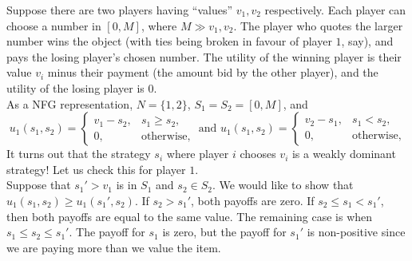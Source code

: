 	\begin{fex}
		Suppose there are two players having ``values'' $v_1,v_2$ respectively. Each player can choose a number in $[0,M]$, where $M \gg v_1,v_2$. The player who quotes the larger number wins the object (with ties being broken in favour of player $1$, say), and pays the losing player's chosen number. The utility of the winning player is their value $v_i$ minus their payment (the amount bid by the other player), and the utility of the losing player is $0$.\\
		As a NFG representation, $N = \{1,2\}$, $S_1 = S_2 = [0,M]$, and
		\[ u_1(s_1,s_2) = \begin{cases} v_1 - s_2, & s_1 \ge s_2, \\ 0, & \text{otherwise,} \end{cases} \text{ and } u_1(s_1,s_2) = \begin{cases} v_2 - s_1, & s_1 < s_2, \\ 0, & \text{otherwise,} \end{cases} \]
		It turns out that the strategy $s_i$ where player $i$ chooses $v_i$ is a weakly dominant strategy! Let us check this for player $1$.\\
		Suppose that $s_1' > v_1$ is in $S_1$ and $s_2 \in S_2$. We would like to show that $u_1(s_1,s_2) \ge u_1(s_1',s_2)$. If $s_2 > s_1'$, both payoffs are zero. If $s_2 \le s_1 < s_1'$, then both payoffs are equal to the same value. The remaining case is when $s_1 \le s_2 \le s_1'$. The payoff for $s_1$ is zero, but the payoff for $s_1'$ is non-positive since we are paying more than we value the item.
	\end{fex}

\clearpage